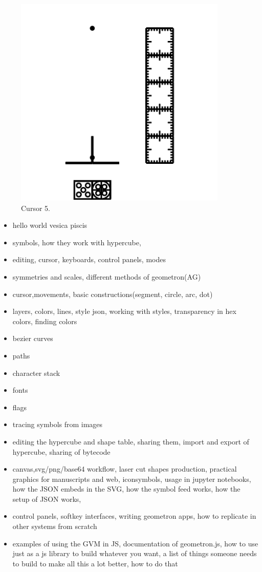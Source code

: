 \begin{figure}
	\centering
	\includegraphics[width=4in]{figures/web2d/cursor5.png}
	\caption[cursor5]
	{Cursor 5.}
\end{figure}


\begin{itemize}
\tightlist
\item
hello world vesica piscis
\item
symbols, how they work with hypercube, 
\item
editing, cursor, keyboards, control panels, modes
\item
symmetries and scales, different methods of geometron(AG)
\item
cursor,movements, basic constructions(segment, circle, arc, dot)
\item
layers, colors, lines, style json, working with styles, transparency in hex colors, finding colors
\item
bezier curves
\item
paths
\item
character stack
\item
fonts
\item
flags
\item
tracing symbols from images
\item
editing the hypercube and shape table, sharing them, import and export of hypercube, sharing of bytecode
\item
canvas,svg/png/base64 workflow, laser cut shapes production, practical graphics for manuscripts and web, iconsymbols, usage in jupyter notebooks, how the JSON embeds in the SVG, how the symbol feed works, how the setup of JSON works,
\item
control panels, softkey interfaces, writing geometron apps, how to replicate in other systems from scratch
\item
examples of using the GVM in JS, documentation of geometron.js, how to use just as a js library to build whatever you want, a list of things someone needs to build to make all this a lot better, how to do that
\end{itemize}